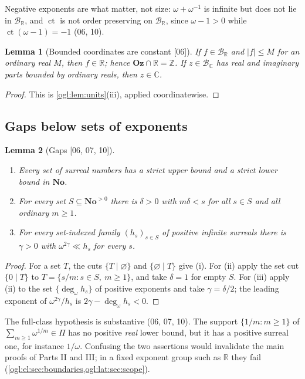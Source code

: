 \documentclass[11pt,oneside]{article}
\numberwithin{equation}{section}
\newtheorem{lemma}[lemma]{Lemma}
\theoremstyle{definition}
\theoremstyle{remark}
\newcommand{\No}{\mathbf{No}}
\newcommand{\Oz}{\mathbf{Oz}}
\newcommand{\Z}{\mathbb Z}
\newcommand{\R}{\mathbb R}
\newcommand{\C}{\mathbb C}
\newcommand{\BR}{\mathcal B_{\R}}
\newcommand{\BC}{\mathcal B_{\C}}
\newcommand{\ct}{\operatorname{ct}}
\newcommand{\ddeg}{\operatorname{deg}_{\omega}}
\newcommand{\src}[1]{\textup{\textsf{\small[#1]}}}
\begin{document}
Negative exponents are what matter, not size: $\omega+\omega^{-1}$ is infinite
but does not lie in $\BR$, and $\ct$ is not order preserving on $\BR$, since
$\omega-1>0$ while $\ct(\omega-1)=-1$ (06, 10).

\begin{lemma}[Bounded coordinates are constant \src{06}]\label{ogl:lem:bounded}
If $f\in\BR$ and $|f|\le M$ for an ordinary real $M$, then $f\in\R$; hence
$\Oz\cap\R=\Z$. If $z\in\BC$ has real and imaginary parts bounded by ordinary
reals, then $z\in\C$.
\end{lemma}
\begin{proof}
This is \cref{ogl:lem:units}(iii), applied coordinatewise.
\end{proof}

\subsection{Gaps below sets of exponents}\label{ogl:sub:gaps}

\begin{lemma}[Gaps \src{06, 07, 10}]\label{ogl:lem:gap}
\leavevmode
\begin{enumerate}
\item Every set of surreal numbers has a strict upper bound and a strict lower
bound in $\No$.
\item For every set $S\subseteq\No^{>0}$ there is $\delta>0$ with $m\delta<s$
for all $s\in S$ and all ordinary $m\ge1$.
\item For every set-indexed family $(h_s)_{s\in S}$ of positive infinite
surreals there is $\gamma>0$ with $\omega^{2\gamma}\ll h_s$ for every $s$.
\end{enumerate}
\end{lemma}
\begin{proof}
For a set $T$, the cuts $\{T\mid\varnothing\}$ and $\{\varnothing\mid T\}$
give (i). For (ii) apply the set cut $\{0\mid T\}$ to
$T=\{s/m:s\in S,\ m\ge1\}$, and take $\delta=1$ for empty $S$. For (iii) apply
(ii) to the set $\{\ddeg h_s\}$ of positive exponents and take $\gamma=\delta/2$;
the leading exponent of $\omega^{2\gamma}/h_s$ is $2\gamma-\ddeg h_s<0$.
\end{proof}

The full-class hypothesis is substantive (06, 07, 10). The support
$\{1/m:m\ge1\}$ of $\sum_{m\ge1}\omega^{1/m}\in\Pi$ has no positive \emph{real}
lower bound, but it has a positive surreal one, for instance $1/\omega$.
Confusing the two assertions would invalidate the main proofs of Parts II and
III; in a fixed exponent group such as $\R$ they fail
(\cref{ogl:el:sec:boundaries,ogl:lat:sec:scope}).
\end{document}
